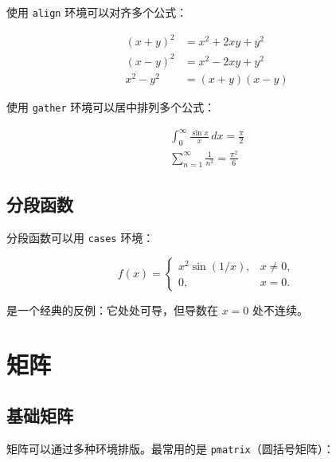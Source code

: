 使用 \lstinline|align| 环境可以对齐多个公式：

\begin{align}
    (x + y)^2 &= x^2 + 2xy + y^2 \label{eq:square-sum} \\
    (x - y)^2 &= x^2 - 2xy + y^2 \label{eq:square-diff} \\
    x^2 - y^2 &= (x + y)(x - y) \label{eq:diff-squares}
\end{align}


使用 \lstinline|gather| 环境可以居中排列多个公式：

\begin{gather}
    \int_{0}^{\infty} \frac{\sin x}{x}\,dx = \frac{\pi}{2} \label{eq:dirichlet} \\
    \sum_{n=1}^{\infty} \frac{1}{n^2} = \frac{\pi^2}{6} \label{eq:basel}
\end{gather}


\subsection{分段函数}

分段函数可以用 \lstinline|cases| 环境：

\begin{equation}
    f(x) = \begin{cases}
        x^2 \sin(1/x), & x \neq 0, \\
        0,              & x = 0.
    \end{cases}
    \label{eq:piecewise}
\end{equation}

 是一个经典的反例：它处处可导，但导数在 $x = 0$ 处不连续。


\section{矩阵}

\subsection{基础矩阵}

矩阵可以通过多种环境排版。最常用的是 \lstinline|pmatrix|（圆括号矩阵）：

